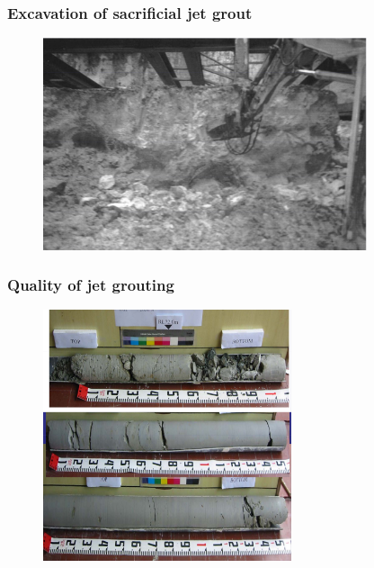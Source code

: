 \documentclass[notes]{beamer}
\begin{document}
\begin{frame}
\frametitle{Excavation of sacrificial jet grout}
\begin{figure}[ht]
	\centering
	\includegraphics[width=0.85\textwidth]{figs/excavation-jet-grout.png}
\end{figure}
\end{frame}

\begin{frame}
\frametitle{Quality of jet grouting}
\begin{figure}[ht]
	\centering
	\includegraphics[width=0.65\textwidth]{figs/jet-grout-cores.png}
\end{figure}
\end{frame}
\end{document}
